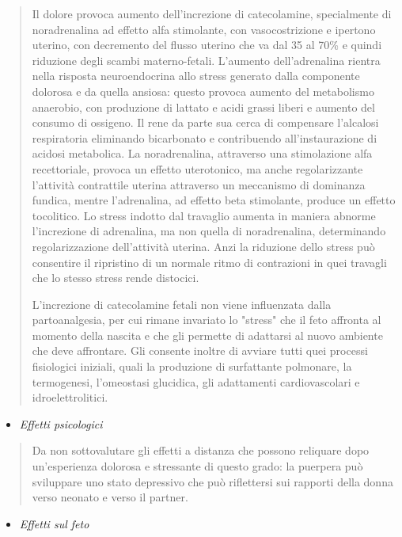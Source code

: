 \documentclass[]{article}
\begin{document}
\begin{quote}
Il dolore provoca aumento dell'increzione di catecolamine, specialmente
di noradrenalina ad effetto alfa stimolante, con vasocostrizione e
ipertono uterino, con decremento del flusso uterino che va dal 35 al
70\% e quindi riduzione degli scambi materno-fetali. L'aumento
dell'adrenalina rientra nella risposta neuroendocrina allo stress
generato dalla componente dolorosa e da quella ansiosa: questo provoca
aumento del metabolismo anaerobio, con produzione di lattato e acidi
grassi liberi e aumento del consumo di ossigeno. Il rene da parte sua
cerca di compensare l'alcalosi respiratoria eliminando bicarbonato e
contribuendo all'instaurazione di acidosi metabolica. La noradrenalina,
attraverso una stimolazione alfa recettoriale, provoca un effetto
uterotonico, ma anche regolarizzante l'attività contrattile uterina
attraverso un meccanismo di dominanza fundica, mentre l'adrenalina, ad
effetto beta stimolante, produce un effetto tocolitico. Lo stress
indotto dal travaglio aumenta in maniera abnorme l'increzione di
adrenalina, ma non quella di noradrenalina, determinando
regolarizzazione dell'attività uterina. Anzi la riduzione dello stress
può consentire il ripristino di un normale ritmo di contrazioni in quei
travagli che lo stesso stress rende distocici.

L'increzione di catecolamine fetali non viene influenzata dalla
partoanalgesia, per cui rimane invariato lo "stress" che il feto
affronta al momento della nascita e che gli permette di adattarsi al
nuovo ambiente che deve affrontare. Gli consente inoltre di avviare
tutti quei processi fisiologici iniziali, quali la produzione di
surfattante polmonare, la termogenesi, l'omeostasi glucidica, gli
adattamenti cardiovascolari e idroelettrolitici.
\end{quote}

\begin{itemize}
\item
  \emph{Effetti psicologici}
\end{itemize}

\begin{quote}
Da non sottovalutare gli effetti a distanza che possono reliquare dopo
un'esperienza dolorosa e stressante di questo grado: la puerpera può
sviluppare uno stato depressivo che può riflettersi sui rapporti della
donna verso neonato e verso il partner.
\end{quote}

\begin{itemize}
\item
  \emph{Effetti sul feto}
\end{itemize}
\end{document}
